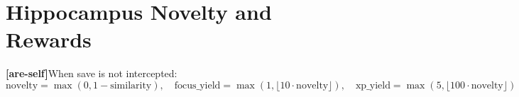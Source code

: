 \documentclass[11pt]{article}
\newcommand{\areself}{\textbf{[are-self]}}
\begin{document}
	\section{Hippocampus Novelty and Rewards}
	\label{are-self:appendix-hippocampus}
	\areself When save is not intercepted:
	$$
	\text{novelty} = \max(0, 1 - \text{similarity}), \quad
	\text{focus\_yield} = \max\left(1, \lfloor 10 \cdot \text{novelty} \rfloor\right), \quad
	\text{xp\_yield} = \max\left(5, \lfloor 100 \cdot \text{novelty} \rfloor\right)
	$$
	
\end{document}
